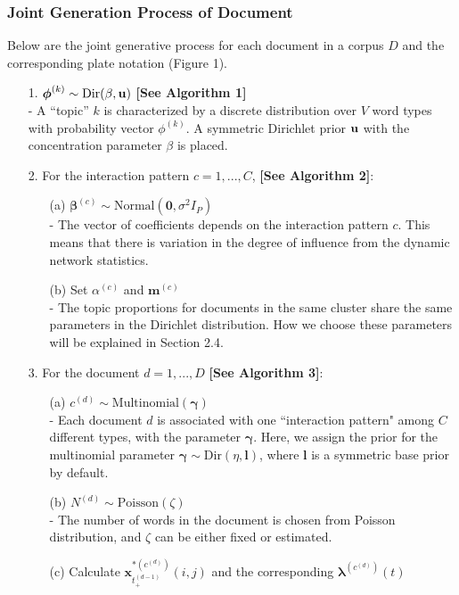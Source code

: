 \documentclass[a4paper]{article}
\begin{document}
\subsubsection{Joint Generation Process of Document}
 Below are the joint generative process for each document in a corpus $D$ and the corresponding plate notation (Figure 1).
\begin{itemize}
	\item[1.] {$\boldsymbol{\phi}^{(k)} \sim \mbox{Dir}(\beta, \bf u)$} \textbf{[See Algorithm 1]}\\
	- A “topic” $k$ is characterized by a discrete distribution over $V$ word types with probability vector $\phi^{(k)}$. A symmetric Dirichlet prior $\bf u$ with the concentration parameter $\beta$ is placed.
	\item[2.] For the interaction pattern $c=1,...,C$,  \textbf{[See Algorithm 2]}: 
		\begin{itemize}
			\item [(a)] $\boldsymbol{\beta}^{(c)}\sim \mbox{Normal}(\textbf{0}, \sigma^2I_P)$ \\
			- The vector of coefficients depends on the interaction pattern $c$. This means that there is variation in the degree of influence from the dynamic network statistics.
			\item [(b)]  Set $\alpha^{(c)}$ and $\boldsymbol{m}^{(c)}$\\
			- The topic proportions for documents in the same cluster share the same parameters in the Dirichlet distribution. How we choose these parameters will be explained in Section 2.4.
		\end{itemize}
	\item[3.] For the document $d=1,...,D$ \textbf{[See Algorithm 3]}:
	\begin{itemize}
				\item[(a)] $c^{(d)}\sim \mbox{Multinomial}(\boldsymbol{\gamma})$\\
				- Each document $d$ is associated with one ``interaction pattern" among $C$ different types, with the parameter $\boldsymbol{\gamma}$. Here, we assign the prior for the multinomial parameter $\boldsymbol{\gamma} \sim \mbox{Dir}({\eta}, \boldsymbol{l})$, where $\boldsymbol{l}$ is a symmetric base prior by default.
				\item[(b)]  $N^{(d)} \sim \mbox{Poisson}(\zeta)$\\
				- The number of words in the document is chosen from Poisson distribution, and $\zeta$ can be either fixed or estimated.
				\item[(c)] Calculate $\boldsymbol{x}^{*(c^{(d)})}_{t_+^{(d-1)}}(i, j)$ and the corresponding $\boldsymbol{\lambda}^{(c^{(d)})}(t)$\\

\end{itemize}
\end{itemize}
\end{document}
